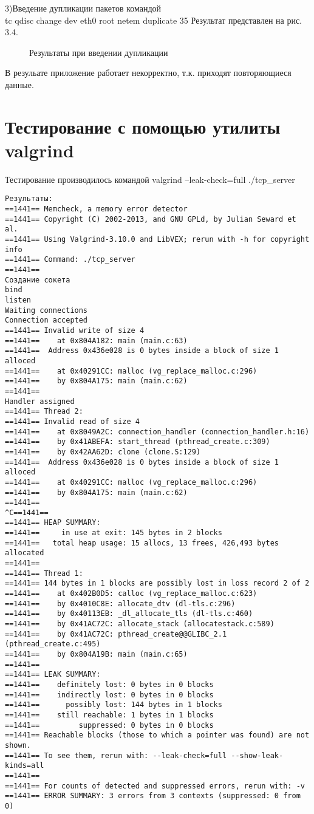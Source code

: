 \documentclass[12pt,a4paper]{report}
\begin{document}
3)Введение дупликации пакетов командой \\
tc qdisc change dev eth0 root netem duplicate 35%
Результат представлен на рис. 3.4.\\
\begin{figure}[h!]
				\caption{Результаты при введении дупликации}
				\label{img:stest4}
			\end{figure}
В резульате приложение работает некорректно, т.к. приходят повторяющиеся данные.\\
\chapter{Тестирование с помощью утилиты valgrind}
Тестирование производилось командой valgrind --leak-check=full ./tcp\_server\\
\begin{lstlisting}
Результаты:
==1441== Memcheck, a memory error detector
==1441== Copyright (C) 2002-2013, and GNU GPLd, by Julian Seward et al.
==1441== Using Valgrind-3.10.0 and LibVEX; rerun with -h for copyright info
==1441== Command: ./tcp_server
==1441== 
Создание сокета
bind
listen
Waiting connections
Connection accepted
==1441== Invalid write of size 4
==1441==    at 0x804A182: main (main.c:63)
==1441==  Address 0x436e028 is 0 bytes inside a block of size 1 alloced
==1441==    at 0x40291CC: malloc (vg_replace_malloc.c:296)
==1441==    by 0x804A175: main (main.c:62)
==1441== 
Handler assigned
==1441== Thread 2:
==1441== Invalid read of size 4
==1441==    at 0x8049A2C: connection_handler (connection_handler.h:16)
==1441==    by 0x41ABEFA: start_thread (pthread_create.c:309)
==1441==    by 0x42AA62D: clone (clone.S:129)
==1441==  Address 0x436e028 is 0 bytes inside a block of size 1 alloced
==1441==    at 0x40291CC: malloc (vg_replace_malloc.c:296)
==1441==    by 0x804A175: main (main.c:62)
==1441== 
^C==1441== 
==1441== HEAP SUMMARY:
==1441==     in use at exit: 145 bytes in 2 blocks
==1441==   total heap usage: 15 allocs, 13 frees, 426,493 bytes allocated
==1441== 
==1441== Thread 1:
==1441== 144 bytes in 1 blocks are possibly lost in loss record 2 of 2
==1441==    at 0x402B0D5: calloc (vg_replace_malloc.c:623)
==1441==    by 0x4010C8E: allocate_dtv (dl-tls.c:296)
==1441==    by 0x40113EB: _dl_allocate_tls (dl-tls.c:460)
==1441==    by 0x41AC72C: allocate_stack (allocatestack.c:589)
==1441==    by 0x41AC72C: pthread_create@@GLIBC_2.1 (pthread_create.c:495)
==1441==    by 0x804A19B: main (main.c:65)
==1441== 
==1441== LEAK SUMMARY:
==1441==    definitely lost: 0 bytes in 0 blocks
==1441==    indirectly lost: 0 bytes in 0 blocks
==1441==      possibly lost: 144 bytes in 1 blocks
==1441==    still reachable: 1 bytes in 1 blocks
==1441==         suppressed: 0 bytes in 0 blocks
==1441== Reachable blocks (those to which a pointer was found) are not shown.
==1441== To see them, rerun with: --leak-check=full --show-leak-kinds=all
==1441== 
==1441== For counts of detected and suppressed errors, rerun with: -v
==1441== ERROR SUMMARY: 3 errors from 3 contexts (suppressed: 0 from 0)
\end{lstlisting}
\end{document}
